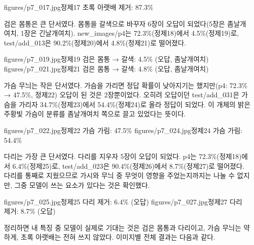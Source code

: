 \documentclass[11pt]{article}
\begin{document}
           {figures/p7_017.jpg}{정제17 초록 아랫배 제거: 87.3\%}

검은 몸통은 큰 단서였다. 몸통을 갈색으로 바꾸자 6장이 오답이 되었다(5장은 좀날개여치, 1장은 긴날개여치). new\_images/p4는 72.3\%(정제18)에서 4.5\%(정제19)로, test/add\_013은 90.2\%(정제20)에서 4.8\%(정제21)로 떨어졌다.

           {figures/p7_019.jpg}{정제19 검은 몸통 → 갈색: 4.5\% (오답, 좀날개여치)}
           {figures/p7_021.jpg}{정제21 검은 몸통 → 갈색: 4.8\% (오답, 좀날개여치)}

가슴 무늬는 작은 단서였다. 가슴을 가리면 정답 확률이 낮아지기는 했지만(p4: 72.3\% → 47.5\%, 정제22) 오답이 된 것은 2장뿐이었다. 오히려 오답이던 test/add\_031은 가슴을 가리자 34.7\%(정제23)에서 54.4\%(정제24)로 올라 정답이 되었다. 이 개체의 밝은 주황빛 가슴이 분류를 좀날개여치 쪽으로 끌고 있었다는 뜻이다.

           {figures/p7_022.jpg}{정제22 가슴 가림: 47.5\%}
           {figures/p7_024.jpg}{정제24 가슴 가림: 54.4\%}

다리는 가장 큰 단서였다. 다리를 지우자 5장이 오답이 되었다. p4는 72.3\%(정제18)에서 6.4\%(정제25)로, test/add\_023은 90.4\%(정제26)에서 8.7\%(정제27)로 떨어졌다. 다리를 통째로 지웠으므로 가시와 무늬 중 무엇이 영향을 주었는지까지는 나눌 수 없지만, 그중 모델이 쓰는 요소가 있다는 것은 확인했다.

           {figures/p7_025.jpg}{정제25 다리 제거: 6.4\% (오답)}
           {figures/p7_027.jpg}{정제27 다리 제거: 8.7\% (오답)}

정리하면 내 특징 중 모델이 실제로 기대는 것은 검은 몸통과 다리이고, 가슴 무늬는 약하게, 초록 아랫배는 전혀 쓰지 않았다. 이미지별 전체 결과는 다음과 같다.
\end{document}
